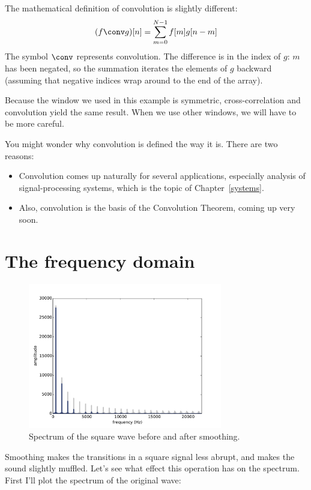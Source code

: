 \documentclass[12pt]{book}
\begin{document}
The mathematical definition of convolution is slightly different:
%
\[ (f \conv g)[n] = \sum_{m=0}^{N-1} f[m] g[n-m]  \]
%
The symbol $\conv$ represents convolution.  The difference is in the
index of $g$: $m$ has been negated, so the summation iterates the
elements of $g$ backward (assuming that negative indices wrap around
to the end of the array).

Because the window we used in this example is symmetric,
cross-correlation and convolution yield the same result.  When we use
other windows, we will have to be more careful.

You might wonder why convolution is defined the way it is.  There
are two reasons:

\begin{itemize}

\item Convolution comes up naturally for several applications,
especially analysis of signal-processing systems, which is
the topic of Chapter~\ref{systems}.

\item Also, convolution is the basis of the Convolution Theorem,
coming up very soon.

\end{itemize}


\section{The frequency domain}

\begin{figure}
\centerline{\includegraphics[height=2.5in]{figs/convolution4.pdf}}
\caption{Spectrum of the square wave before and after smoothing.}
\label{fig.convolution4}
\end{figure}

Smoothing makes the transitions in a square signal less abrupt,
and makes the sound slightly muffled.  Let's see what effect this
operation has on the spectrum.  First I'll plot the spectrum
of the original wave:
\end{document}
